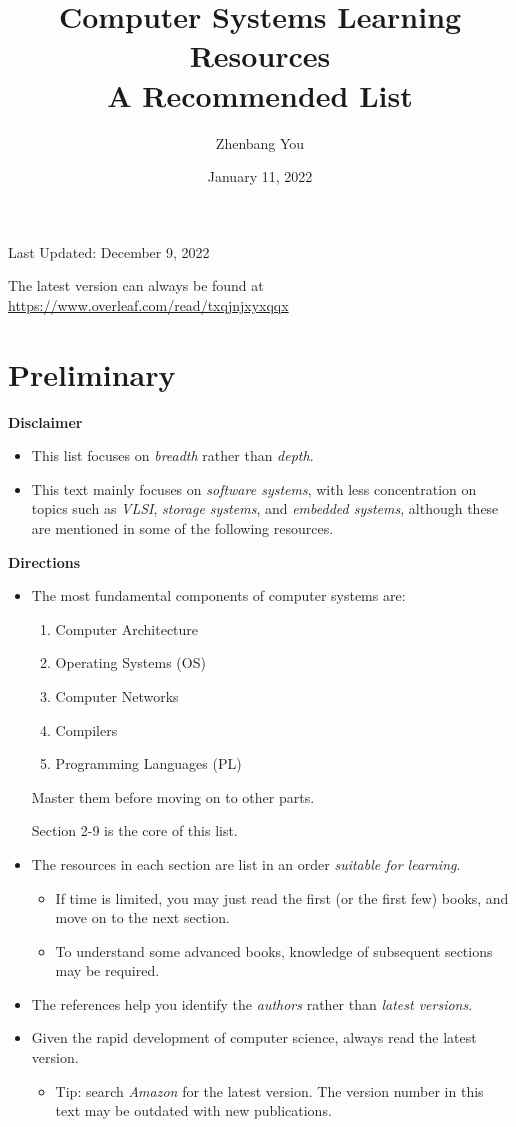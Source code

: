 \documentclass{article}
\title{\Huge{Computer Systems Learning Resources}\\ \huge{A Recommended List}}
\author{Zhenbang You}
\date{January 11, 2022}
\begin{document}
\maketitle

\centerline{\large{Last Updated: December 9, 2022}}

\vspace{20pt}

The latest version can always be found at \href{https://www.overleaf.com/read/txqjnjxyxqqx}{https://www.overleaf.com/read/txqjnjxyxqqx}

\section{Preliminary}

\textbf{Disclaimer}
\begin{itemize}
    \item This list focuses on \emph{breadth} rather than \emph{depth}.
    \item This text mainly focuses on \emph{software systems}, with less concentration on topics such as \emph{VLSI}, \emph{storage systems}, and \emph{embedded systems}, although these are mentioned in some of the following resources.
\end{itemize}

\noindent
\textbf{Directions}
\begin{itemize}
    \item The most fundamental components of computer systems are:
    \begin{enumerate}
        \item Computer Architecture
        \item Operating Systems (OS)
        \item Computer Networks
        \item Compilers
        \item Programming Languages (PL)
    \end{enumerate}
    Master them before moving on to other parts.
    
    Section 2-9 is the core of this list.
    \item The resources in each section are list in an order \emph{suitable for learning}.
    \begin{itemize}
        \item If time is limited, you may just read the first (or the first few) books, and move on to the next section.
        \item To understand some advanced books, knowledge of subsequent sections may be required.
    \end{itemize}
    \item The references help you identify the \emph{authors} rather than \emph{latest versions}.
    \item Given the rapid development of computer science, always read the latest version.
    \begin{itemize}
        \item Tip: search \emph{Amazon} for the latest version. The version number in this text may be outdated with new publications.
    \end{itemize}
\end{itemize}
\end{document}
